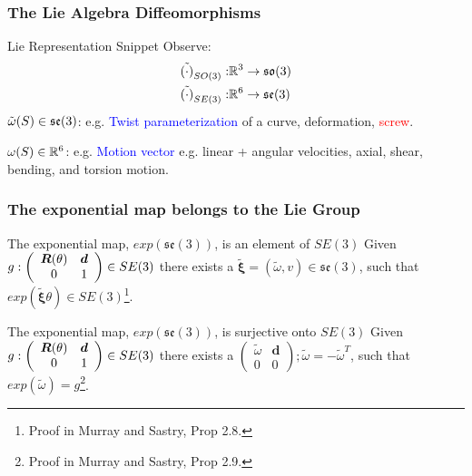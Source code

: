 \begin{frame}
	\frametitle{The Lie Algebra Diffeomorphisms}	
	\begin{block}{Lie Representation Snippet}
		Observe:  
		\begin{align}
			\tilde{(\cdot)}_{SO(3)}: &\mathbb{R}^3 \rightarrow \mathfrak{so}(3) \\
			\tilde{(\cdot)}_{SE(3)}: &\mathbb{R}^6 \rightarrow \mathfrak{se}(3) 
		\end{align}
		$\tilde{\omega}(S)\in \mathfrak{se}(3)$: e.g. \textcolor{blue}{Twist parameterization} of a curve, deformation, \textcolor{red}{screw}.
		
		${\omega}(S)\in \mathbb{R}^6$: e.g. \textcolor{blue}{Motion vector} e.g. linear + angular velocities, axial, shear, bending, and torsion motion.
	\end{block}
\end{frame}


\begin{frame}
	\frametitle{The exponential map belongs to the Lie Group}	
	\begin{block}{The exponential map, $exp(\mathfrak{se}(3))$, is an element of $SE(3)$}
		Given $g:  \left(\begin{array}{cc}
			\bm{R}(\theta) & \bm{d} \\
			0 & 1
		\end{array}\right) \in SE(3)$ there exists a $\tilde{\bm{\xi}}=(\tilde{\omega}, v) \in \mathfrak{se}(3)$, such that  $exp(\tilde{\bm{\xi}} \theta) \in SE(3)$\footnote{Proof in Murray and Sastry, Prop 2.8.}.
	\end{block}
	
	\begin{block}{The exponential map, $exp(\mathfrak{se}(3))$, is surjective onto $SE(3)$}
		Given $g:  \left(\begin{array}{cc}
			\bm{R}(\theta) & \bm{d} \\
			0 & 1
		\end{array}\right) \in SE(3)$ there exists a $\left(\begin{array}{cc}
		\tilde{\omega} & \bm{d} \\
		0 & 0
	\end{array}\right); \tilde{\omega}=-\tilde{\omega}^T$, such that  $exp(\tilde{\omega}) =g$\footnote{Proof in Murray and Sastry, Prop 2.9.}.
	\end{block}
\end{frame}

